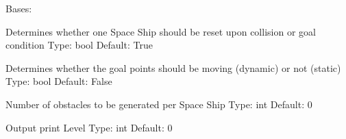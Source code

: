 \documentclass[letterpaper,10pt,english]{sphinxmanual}
\begin{document}
\begin{fulllineitems}
\label{\detokenize{pomdp_spaceship_env:pomdp_spaceship_env.Config}}
Bases: 

\begin{fulllineitems}
\label{\detokenize{pomdp_spaceship_env:pomdp_spaceship_env.Config.AutoReset}}
Determines whether one Space Ship should be reset upon collision or goal condition
Type: bool
Default: True

\end{fulllineitems}


\begin{fulllineitems}
\label{\detokenize{pomdp_spaceship_env:pomdp_spaceship_env.Config.DynamicGoals}}
Determines whether the goal points should be moving (dynamic) or not (static)
Type: bool
Default: False

\end{fulllineitems}


\begin{fulllineitems}
\label{\detokenize{pomdp_spaceship_env:pomdp_spaceship_env.Config.NumObs}}
Number of obstacles to be generated per Space Ship
Type: int
Default: 0

\end{fulllineitems}


\begin{fulllineitems}
\label{\detokenize{pomdp_spaceship_env:pomdp_spaceship_env.Config.PrintLevel}}
Output print Level
Type: int
Default: 0


\end{fulllineitems}
\end{fulllineitems}
\end{document}
